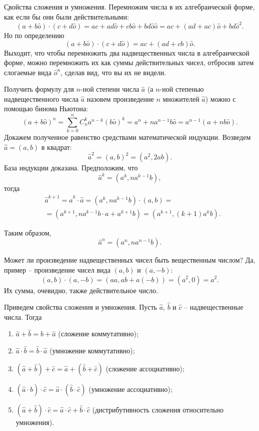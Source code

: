 \b{Свойства сложения и умножения.} Перемножим числа в их алгебраической форме, как если бы они были действительными:
	$$(a+b\hat{o})\cdot(c+d\hat{o})=ac+ad\hat{o}+cb\hat{o}+bd\hat{o}\hat{o}=ac+(ad+ac)\hat{o}+bd\hat{o}^2.$$
Но по определению
	$$(a+b\hat{o})\cdot(c+d\hat{o})=ac+(ad+cb)\hat{o}.$$
Выходит, что чтобы перемножить два надвещественных числа в алгебраической форме, можно перемножить их как суммы действительных чисел, отбросив затем слогаемые вида $\hat{o}^n$, сделав вид, что вы их не видели. 
\begin{example} Получить формулу для $n$-ной степени числа $\hat{a}$  (а $n$-ной степенью надвещественного числа $\hat{a}$ назовем произведение $n$ множителей $\hat{a}$) можно с помощью бинома Ньютона:
	$$(a+b\hat{o})^n=\sum_{k=0}^n C_n^k a^{n-k} (b\hat{o})^k=a^n+na^{n-1}b\hat{o}=a^{n-1}(a+nb\hat{o}).$$
Докажем полученное равенство средствами математической индукции. Возведем $\hat{a}=(a, b)$ в квадрат:
	$$\hat{a}^2=(a, b)^2=(a^2, 2ab).$$
База индукции доказана. Предположим, что
	$$\hat{a}^k=(a^k, na^{k-1}b),$$
тогда
	\begin{eqnarray*}
	& \hat{a}^{k+1}=\hat{a}^k\cdot\hat{a}=(a^k, na^{k-1}b)\cdot(a, b)= \\
	& = (a^{k+1}, na^{k-1}b\cdot a+a^{k+1}b)=(a^{k+1}, (k+1)a^kb).
	\end{eqnarray*}
\end{example}
Таким образом,
\begin{equation}\label{eq:npower}
	\hat{a}^n=(a^n, na^{n-1}b).
\end{equation}
\begin{example} Может ли произведение надвещественных чисел быть вещественным числом? Да, пример -- произведение чисел вида $(a, b)$ и $(a, -b)$:
	$$(a, b)\cdot(a, -b)=(aa, ab+a(-b))=(a^2, 0)=a^2.$$
Их сумма, очевидно, также действительное число.
\end{example}
Приведем свойства сложения и умножения. Пусть $\hat{a}$, $\hat{b}$ и $\hat{c}$ -- надвещественные числа. Тогда
\begin{enumerate}
	\item $\hat{a}+\hat{b}=\hat{b}+\hat{a}$ (сложение коммутативно); 
	\item $\hat{a}\cdot\hat{b}=\hat{b}\cdot\hat{a}$ (умножение коммутативно); 
	\item $(\hat{a}+\hat{b})+\hat{c}=\hat{a}+(\hat{b}+\hat{c})$ (сложение ассоциативно); 
	\item $(\hat{a}\cdot\hat{b})\cdot\hat{c}=\hat{a}\cdot(\hat{b}\cdot\hat{c})$ (умножение ассоциативно);
	\item $(\hat{a}+\hat{b})\cdot\hat{c}=\hat{a}\cdot\hat{c}+\hat{b}\cdot\hat{c}$ (дистрибутивность сложения относительно умножения).
\end{enumerate}
